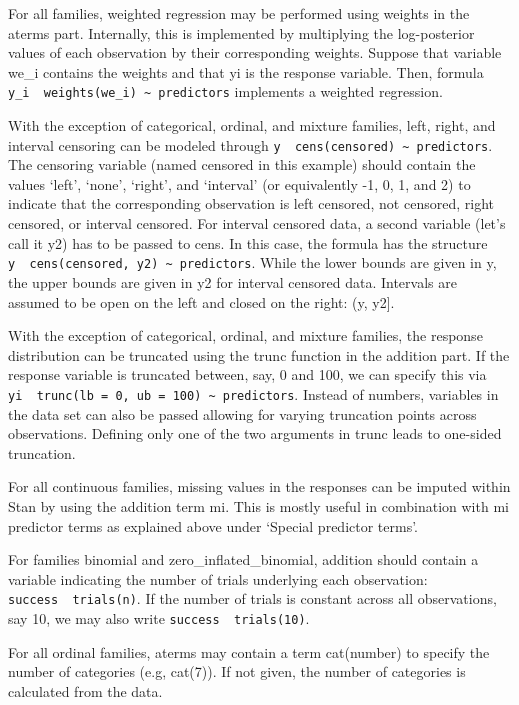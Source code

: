 \documentclass[]{book}
\begin{document}
For all families, weighted regression may be performed using weights in the aterms part. Internally, this is implemented by multiplying the log-posterior values of each observation by their corresponding weights. Suppose that variable we\_i contains the weights and that yi is the response variable. Then, formula \texttt{y\_i\ \textbar{}\ weights(we\_i)\ \textasciitilde{}\ predictors} implements a weighted regression.

With the exception of categorical, ordinal, and mixture families, left, right, and interval censoring can be modeled through \texttt{y\ \textbar{}\ cens(censored)\ \textasciitilde{}\ predictors}. The censoring variable (named censored in this example) should contain the values `left', `none', `right', and `interval' (or equivalently -1, 0, 1, and 2) to indicate that the corresponding observation is left censored, not censored, right censored, or interval censored. For interval censored data, a second variable (let's call it y2) has to be passed to cens. In this case, the formula has the structure \texttt{y\ \textbar{}\ cens(censored,\ y2)\ \textasciitilde{}\ predictors}. While the lower bounds are given in y, the upper bounds are given in y2 for interval censored data. Intervals are assumed to be open on the left and closed on the right: (y, y2{]}.

With the exception of categorical, ordinal, and mixture families, the response distribution can be truncated using the trunc function in the addition part. If the response variable is truncated between, say, 0 and 100, we can specify this via \texttt{yi\ \textbar{}\ trunc(lb\ =\ 0,\ ub\ =\ 100)\ \textasciitilde{}\ predictors}. Instead of numbers, variables in the data set can also be passed allowing for varying truncation points across observations. Defining only one of the two arguments in trunc leads to one-sided truncation.

For all continuous families, missing values in the responses can be imputed within Stan by using the addition term mi. This is mostly useful in combination with mi predictor terms as explained above under `Special predictor terms'.

For families binomial and zero\_inflated\_binomial, addition should contain a variable indicating the number of trials underlying each observation: \texttt{success\ \textbar{}\ trials(n)}. If the number of trials is constant across all observations, say 10, we may also write \texttt{success\ \textbar{}\ trials(10)}.

For all ordinal families, aterms may contain a term cat(number) to specify the number of categories (e.g, cat(7)). If not given, the number of categories is calculated from the data.
\end{document}
